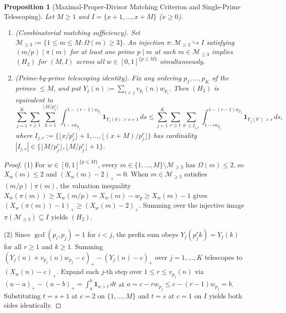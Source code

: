 \documentclass[11pt]{article}
\newtheorem{proposition}[theorem]{Proposition}
\theoremstyle{remark}
\begin{document}
\begin{proposition}[Maximal-Proper-Divisor Matching Criterion and Single-Prime Telescoping]
\label{prop:h2}
Let $M \ge 1$ and $I = \{x + 1, \dots, x + M\}$ ($x \ge 0$).
\begin{enumerate}
\item \emph{(Combinatorial matching sufficiency).} Set $\mathcal{M}_{\ge 3} := \{1 \le m \le M : \Omega(m) \ge 3\}$. An injection $\pi : \mathcal{M}_{\ge 3} \hookrightarrow I$ satisfying $(m / p) \mid \pi(m)$ for at least one prime $p \mid m$ at each $m \in \mathcal{M}_{\ge 3}$ implies $(H_2)$ for $(M, I)$ across all $w \in [0, 1]^{\{p \le M\}}$ simultaneously.
\item \emph{(Prime-by-prime telescoping identity).} Fix any ordering $p_1, \dots, p_K$ of the primes $\le M$, and put $Y_j(n) := \sum_{i < j} v_{p_i}(n) w_{p_i}$. Then $(H_2)$ is equivalent to
\[
\sum_{j = 1}^K \sum_{r \ge 1} \sum_{k = 1}^{\lfloor M / p_j^r \rfloor} \int_{1 - r w_{p_j}}^{1 - (r - 1) w_{p_j}} \mathbf{1}_{Y_j(k) > s + 1} \, ds \le \sum_{j = 1}^K \sum_{r \ge 1} \sum_{b' \in I_{j, r}} \int_{1 - r w_{p_j}}^{1 - (r - 1) w_{p_j}} \mathbf{1}_{Y_j(b') > s} \, ds,
\]
where $I_{j, r} := \{\lfloor x / p_j^r \rfloor + 1, \dots, \lfloor (x + M) / p_j^r \rfloor\}$ has cardinality $|I_{j, r}| \in \{\lfloor M / p_j^r \rfloor, \lfloor M / p_j^r \rfloor + 1\}$.
\end{enumerate}
\end{proposition}
\begin{proof}
(1) For $w \in [0, 1]^{\{p \le M\}}$, every $m \in \{1, \dots, M\} \setminus \mathcal{M}_{\ge 3}$ has $\Omega(m) \le 2$, so $X_w(m) \le 2$ and $(X_w(m) - 2)_+ = 0$. When $m \in \mathcal{M}_{\ge 3}$ satisfies $(m / p) \mid \pi(m)$, the valuation inequality $X_w(\pi(m)) \ge X_w(m / p) = X_w(m) - w_p \ge X_w(m) - 1$ gives $(X_w(\pi(m)) - 1)_+ \ge (X_w(m) - 2)_+$. Summing over the injective image $\pi(\mathcal{M}_{\ge 3}) \subseteq I$ yields $(H_2)$.

(2) Since $\gcd(p_i, p_j) = 1$ for $i < j$, the prefix sum obeys $Y_j(p_j^r k) = Y_j(k)$ for all $r \ge 1$ and $k \ge 1$. Summing $(Y_j(n) + v_{p_j}(n) w_{p_j} - c)_+ - (Y_j(n) - c)_+$ over $j = 1, \dots, K$ telescopes to $(X_w(n) - c)_+$. Expand each $j$-th step over $1 \le r \le v_{p_j}(n)$ via $(u - a)_+ - (u - b)_+ = \int_a^b \mathbf{1}_{u > t} \, dt$ at $a = c - r w_{p_j} \le c - (r - 1) w_{p_j} = b$. Substituting $t = s + 1$ at $c = 2$ on $\{1, \dots, M\}$ and $t = s$ at $c = 1$ on $I$ yields both sides identically.
\end{proof}
\end{document}
